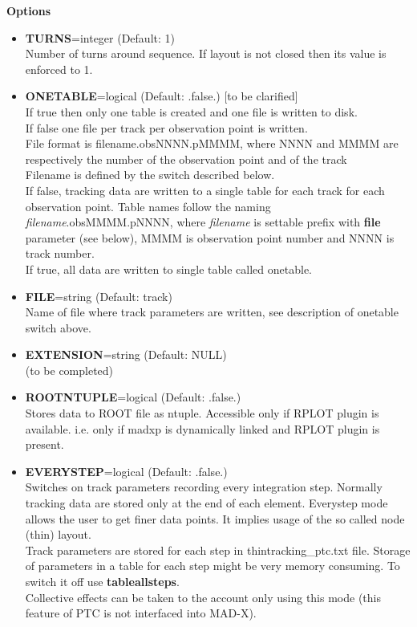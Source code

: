 {\bf Options}\\
\begin{itemize}
   \item {\bf TURNS}=integer (Default: 1)\\
     Number of turns around sequence. If layout is not closed then its
     value is enforced to 1.  
     
   \item {\bf ONETABLE}=logical (Default: .false.) [to be clarified] \\
     If true then only one table is created and one file is written to
     disk. \\
     If false one file per track per observation point is written.\\ 
     File format is filename.obsNNNN.pMMMM, where NNNN and MMMM are
     respectively the number of the observation point and of the track\\
     Filename is defined by the switch described below.   
     \\
     If false, tracking data are written to a single table for each
     track for each observation point. Table names follow the naming
     \textit{filename}.obsMMMM.pNNNN, where \textit{filename} is
     settable prefix with \textbf{file} parameter (see below), MMMM is
     observation point number and NNNN is track number. \\  
     If true, all data are written to single table called onetable. 

  \item {\bf FILE}=string (Default: track)\\
    Name of file where track parameters are written, see description of
    onetable switch above. 

  \item {\bf EXTENSION}=string (Default: NULL)\\
    (to be completed)

  \item {\bf ROOTNTUPLE}=logical (Default: .false.)\\ 
    Stores data to ROOT file as ntuple. Accessible only if RPLOT plugin
    is available. i.e. only if madxp is dynamically linked and RPLOT
    plugin is present.

  \item {\bf EVERYSTEP}=logical (Default: .false.)\\
    Switches on track parameters recording every integration
    step. Normally tracking data are stored only at the end of each
    element. Everystep mode allows the user to get finer data points. It
    implies usage of the so called node (thin) layout. \\ Track
    parameters are stored for each step in thintracking\_ptc.txt
    file. Storage of parameters in a table for each step might be very
    memory consuming. To switch it off use
    \textbf{tableallsteps}.\\  Collective effects can be taken to the
    account only using this mode (this feature of PTC is not interfaced
    into MAD-X).


\end{itemize}
